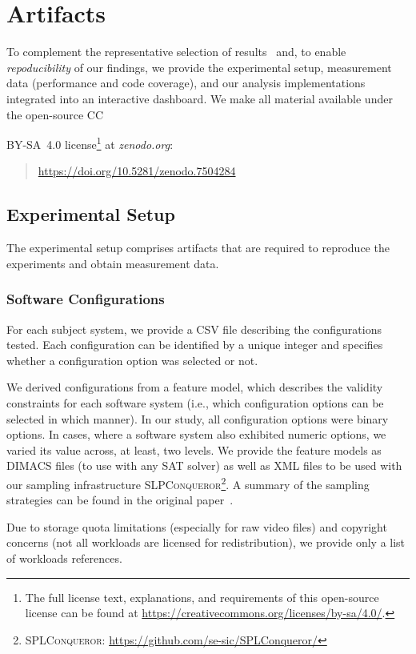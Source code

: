 \section{Artifacts}
To complement the representative selection of results~\cite{muhlbauer_workload_2023} and, to enable \textit{repoducibility} of our findings, we provide the experimental setup, measurement data (performance and code coverage), and our analysis implementations integrated into an interactive dashboard.
We make all material available under the open-source CC~{BY-SA~4.0 license\footnote{The full license text, explanations, and requirements of this open-source license can be found at \url{https://creativecommons.org/licenses/by-sa/4.0/}.} at \textit{zenodo.org}:
\begin{quotation}
	\url{https://doi.org/10.5281/zenodo.7504284}
\end{quotation}


\subsection{Experimental Setup}
The experimental setup comprises artifacts that are required to reproduce the experiments and obtain measurement data. 

\subsubsection{Software Configurations} For each subject system, we provide  a CSV file describing the configurations tested. Each configuration can be identified by a unique integer and specifies whether a configuration option was selected or not. 

We derived configurations from a feature model, which describes the validity constraints for each software system (i.e., which configuration options can be selected in which manner). In our study, all configuration options were binary options. In cases, where a software system also exhibited numeric options, we varied its value across, at least, two levels. We provide the feature models as DIMACS files (to use with any SAT solver) as well as XML files to be used with our sampling infrastructure \textsc{SLPConqueror}\footnote{\textsc{SPLConqueror}: \url{https://github.com/se-sic/SPLConqueror/}}. A summary of the sampling strategies can be found in the original paper~\cite{muhlbauer_workload_2023}.

Due to storage quota limitations (especially for raw video files) and copyright concerns (not all workloads are licensed for redistribution), we provide only a list of workloads references. 

}
